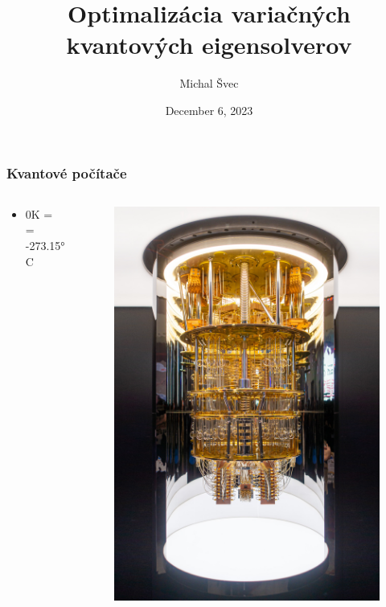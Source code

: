 \documentclass{beamer}
\title{Optimalizácia variačných kvantových eigensolverov}
\author{Michal Švec}
\institute{doc. RNDr. Martin Plesch, PhD.}
\date{December 6, 2023}
\begin{document}
\begin{frame}
	\titlepage
\end{frame}

\begin{frame}
	\frametitle{Kvantové počítače}
		
	\begin{columns}[c]
		\begin{column}{.6\textwidth}
			\centering
						      
			\begin{itemize}
				\item 0K = = -273.15°C
				      
			\end{itemize}
		\end{column}
				      
		\begin{column}{.4\textwidth}
			\centering
						          
			\begin{figure}
				\centering
				\includegraphics[width=1\textwidth]{quantum_computer.jpeg}            
			\end{figure}
		\end{column}
	\end{columns}
		
		
		
\end{frame}
\end{document}
